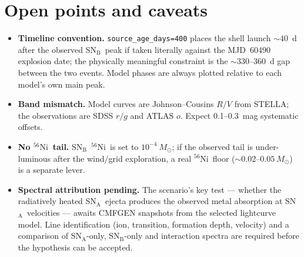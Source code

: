 \documentclass[11pt, a4paper]{article}
\newcommand{\Msun}{\ensuremath{M_\odot}}
\newcommand{\Ni}{\ensuremath{^{56}\mathrm{Ni}}}
\newcommand{\SNa}{SN$_{\mathrm{A}}$}
\newcommand{\SNb}{SN$_{\mathrm{B}}$}
\begin{document}
\section{Open points and caveats}
\label{sec:open}

\begin{itemize}
  \item \textbf{Timeline convention.}  \texttt{source\_age\_days=400} places
    the shell launch $\sim$40~d after the observed \SNb\ peak if taken
    literally against the MJD~60490 explosion date; the physically meaningful
    constraint is the $\sim$330--360~d gap between the two events.  Model
    phases are always plotted relative to each model's own main peak.
  \item \textbf{Band mismatch.}  Model curves are Johnson--Cousins $R/V$ from
    STELLA; the observations are SDSS $r/g$ and ATLAS $o$.  Expect
    0.1--0.3~mag systematic offsets.
  \item \textbf{No \Ni\ tail.}  \SNb\ \Ni\ is set to $10^{-4}~\Msun$; if the
    observed tail is under-luminous after the wind/grid exploration, a real
    \Ni\ floor ($\sim0.02$--$0.05~\Msun$) is a separate lever.
  \item \textbf{Spectral attribution pending.}  The scenario's key test ---
    whether the radiatively heated \SNa\ ejecta produces the observed metal
    absorption at \SNa\ velocities --- awaits CMFGEN \citep{Hillier1998,
    Dessart2015} snapshots from the selected lightcurve model.  Line
    identification (ion, transition, formation depth, velocity) and a
    comparison of \SNa-only, \SNb-only and interaction spectra are required
    before the hypothesis can be accepted.
\end{itemize}



\end{document}
